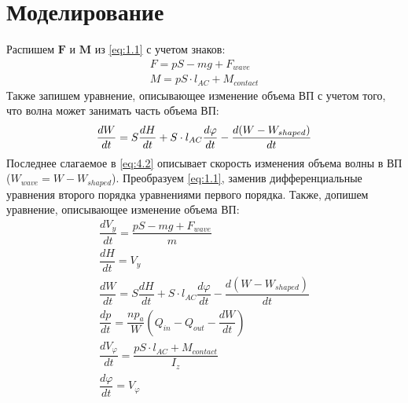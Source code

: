 \documentclass{article}%
\numberwithin{equation}{subsection}
\let\oldsection\section%
\renewcommand{\section}{%
  \renewcommand{\theequation}{\thesection.\arabic{equation}}%
  \oldsection}%
\begin{document}
\section{Моделирование}
Распишем $\mathbf{F}$ и $\mathbf{M}$ из \ref{eq:1.1} с учетом знаков:
\begin{equation}
\begin{gathered}
    F = pS - mg + F_{wave}\\
    M = pS\cdot l_{AC} + M_{contact}
\end{gathered}
\end{equation}
Также запишем уравнение, описывающее изменение объема ВП с учетом того, что волна может занимать часть объема ВП:
\begin{equation}
    \dfrac{dW}{dt}=S\dfrac{dH}{dt}+S\cdot l_{AC}\dfrac{d\varphi}{dt}-\dfrac{d(W-W_{shaped})}{dt}\\
    \label{eq:4.2}
\end{equation}
Последнее слагаемое в \ref{eq:4.2} описывает скорость изменения объема волны в ВП ($W_{wave} = W - W_{shaped}$).
\newline
Преобразуем \ref{eq:1.1}, заменив дифференциальные уравнения второго порядка уравнениями первого порядка. Также, допишем уравнение, описывающее изменение объема ВП:
\begin{equation}
\begin{gathered}
    \dfrac{dV_y}{dt}=\dfrac{pS-mg+F_{wave}}{m}\\
    \dfrac{dH}{dt} = V_y\\
    \dfrac{dW}{dt}=S\dfrac{dH}{dt}+S\cdot l_{AC}\dfrac{d\varphi}{dt}-\dfrac{d(W-W_{shaped})}{dt}\\
    \dfrac{dp}{dt}=\dfrac{np_a}{W}\left(Q_{in} - Q_{out} -\dfrac{dW}{dt}\right)\\
    \dfrac{dV_{\varphi}}{dt}=\dfrac{pS\cdot l_{AC} + M_{contact}}{I_z}\\
    \dfrac{d\varphi}{dt} = V_{\varphi}
\end{gathered}
\end{equation}
\end{document}
